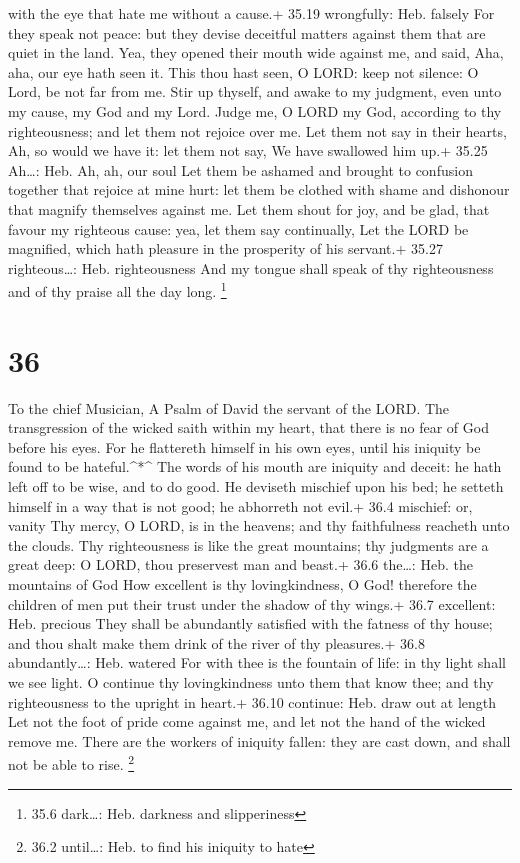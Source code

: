with the eye that hate me without a cause.+ 35.19 wrongfully: Heb.
falsely  For they speak not peace: but they devise
deceitful matters against them that are quiet in the land. 
Yea, they opened their mouth wide against me, and said, Aha, aha, our
eye hath seen it.  This thou hast seen, O LORD: keep not
silence: O Lord, be not far from me.  Stir up thyself, and
awake to my judgment, even unto my cause, my God and my Lord.
 Judge me, O LORD my God, according to thy righteousness;
and let them not rejoice over me.  Let them not say in
their hearts, Ah, so would we have it: let them not say, We have
swallowed him up.+ 35.25 Ah\ldots: Heb. Ah, ah, our soul 
Let them be ashamed and brought to confusion together that rejoice at
mine hurt: let them be clothed with shame and dishonour that magnify
themselves against me.  Let them shout for joy, and be
glad, that favour my righteous cause: yea, let them say continually, Let
the LORD be magnified, which hath pleasure in the prosperity of his
servant.+ 35.27 righteous\ldots: Heb. righteousness  And my
tongue shall speak of thy righteousness and of thy praise all the day
long. \footnote{35.6 dark\ldots: Heb. darkness and slipperiness}

\hypertarget{section-35}{%
\section{36}\label{section-35}}

To the chief Musician, A Psalm of David the servant of the LORD.
 The transgression of the wicked saith within my heart, that
there is no fear of God before his eyes.  For he flattereth
himself in his own eyes, until his iniquity be found to be
hateful.\^{}*\^{}  The words of his mouth are iniquity and
deceit: he hath left off to be wise, and to do good.  He
deviseth mischief upon his bed; he setteth himself in a way that is not
good; he abhorreth not evil.+ 36.4 mischief: or, vanity  Thy
mercy, O LORD, is in the heavens; and thy faithfulness reacheth unto the
clouds.  Thy righteousness is like the great mountains; thy
judgments are a great deep: O LORD, thou preservest man and beast.+ 36.6
the\ldots: Heb. the mountains of God  How excellent is thy
lovingkindness, O God! therefore the children of men put their trust
under the shadow of thy wings.+ 36.7 excellent: Heb. precious
 They shall be abundantly satisfied with the fatness of thy
house; and thou shalt make them drink of the river of thy pleasures.+
36.8 abundantly\ldots: Heb. watered  For with thee is the
fountain of life: in thy light shall we see light.  O
continue thy lovingkindness unto them that know thee; and thy
righteousness to the upright in heart.+ 36.10 continue: Heb. draw out at
length  Let not the foot of pride come against me, and let
not the hand of the wicked remove me.  There are the
workers of iniquity fallen: they are cast down, and shall not be able to
rise. \footnote{36.2 until\ldots: Heb. to find his iniquity to hate}

